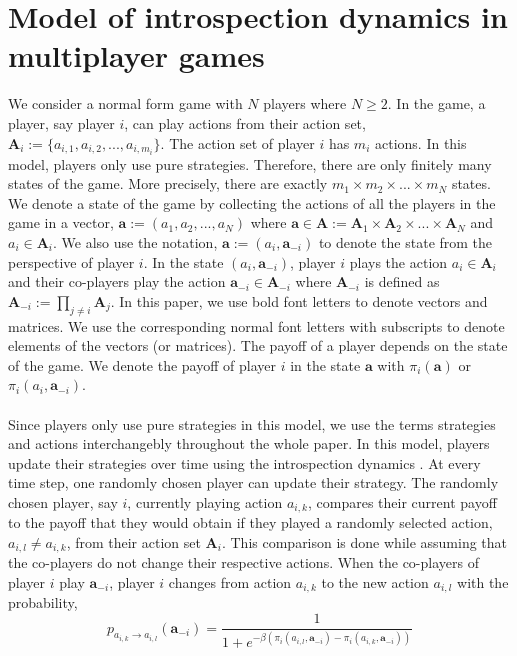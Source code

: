 \documentclass[11pt]{article}
\theoremstyle{plainCl1}
\theoremstyle{plainCl2}
\newcommand{\A}{\mathbf{A}}
\newcommand{\abf}{\mathbf{a}}
\begin{document}
\section*{Model of introspection dynamics in multiplayer games}
We consider a normal form game with $N$ players where $N \geq 2$. In the game, a player, say player $i$, can play actions from their action set, $\A_i := \{a_{i,1}, a_{i,2}, ..., a_{i,m_i} \}$. The action set of player $i$ has $m_i$ actions. In this model, players only use pure strategies. Therefore, there are only finitely many states of the game. More precisely, there are exactly $m_1 \times m_2 \times ... \times m_N$ states. We denote a state of the game by collecting the actions of all the players in the game in a vector, $\abf := (a_1, a_2, ..., a_N)$ where $\abf \in \A := \A_1 \times \A_2 \times ... \times \A_N$ and $a_i \in \A_i$. We also use the notation, $\abf := (a_i, \abf_{-i})$ to denote the state from the perspective of player $i$. In the state $(a_i, \abf_{-i})$, player $i$ plays the action $a_i \in \A_i$ and their co-players play the action $\abf_{-i} \in \A_{-i}$ where $\A_{-i}$ is defined as $\A_{-i}:= \prod_{j \neq i} \A_j$. In this paper, we use bold font letters to denote vectors and matrices. We use the corresponding normal font letters with subscripts to denote elements of the vectors (or matrices). The payoff of a player depends on the state of the game. We denote the payoff of player $i$ in the state $\abf$ with $\pi_i(\abf)$ or $\pi_i(a_i, \abf_{-i})$. \\ \\ 
\noindent Since players only use pure strategies in this model, we use the terms strategies and actions interchangebly throughout the whole paper. In this model, players update their strategies over time using the introspection dynamics \cite{Couto:NJP:2022}. At every time step, one randomly chosen player can update their strategy. The randomly chosen player, say $i$, currently playing  action $a_{i,k}$, compares their current payoff to the payoff that they would obtain if they played a randomly selected action,  $a_{i,l} \neq a_{i,k}$, from their action set $\A_i$. This comparison is done while assuming that the co-players do not change their respective actions. When the co-players of player $i$ play $\abf_{-i}$, player $i$ changes from action $a_{i,k}$ to the new action $a_{i,l}$ with the probability, \\
\begin{equation}
 p_{a_{i,k} \to a_{i,l}} (\abf_{-i})= \frac{1}{1 + e^{\displaystyle -\beta(\pi_i(a_{i,l}, \abf_{-i}) - \pi_i(a_{i,k}, \abf_{-i}))}}
 \label{Eq:introspection-update}
\end{equation}
\end{document}
